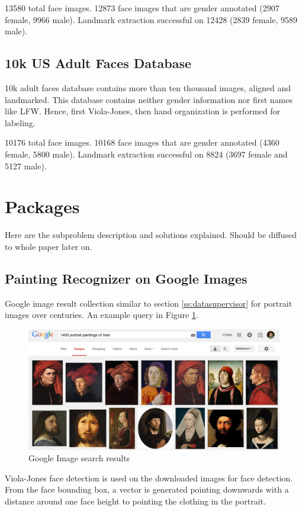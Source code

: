 \documentclass[runningheads]{llncs}
\newcommand{\fillertext}{\textcolor{black!20}{\lipsum[5-6]}}
\begin{document}
13580 total face images. 12873 face images that are gender annotated (2907 female, 9966 male). Landmark extraction successful on 12428 (2839 female, 9589 male).


\subsection{10k US Adult Faces Database}\label{ss-db10k}
10k adult faces\cite{bainbridge2013intrinsic} database contains more than ten thousand images, aligned and landmarked. This database contains neither gender information nor first names like LFW. Hence, first Viola-Jones, then hand organization is performed for labeling.

10176 total face images. 10168 face images that are gender annotated (4360 female, 5800 male). Landmark extraction successful on 8824 (3697 female and 5127 male).

\section{Packages}
Here are the subproblem description and solutions explained. Should be diffused to whole paper later on.

\fillertext

\subsection{Painting Recognizer on Google Images}

Google image result collection similar to section \ref{ss:datasupervisor} for portrait images over centuries. An example query in Figure \ref{pr-googleres}.

\begin{figure}
	\centering
	\includegraphics[width=.8\textwidth]{PaintingRecognizer-query_results}
	\caption{Google Image search results}
	\label{pr-googleres}	
\end{figure}

Viola-Jones\cite{viola} face detection is used on the downloaded images for face detection. From the face bounding box, a vector is generated pointing downwards with a distance around one face height to pointing the clothing in the portrait.
\end{document}

